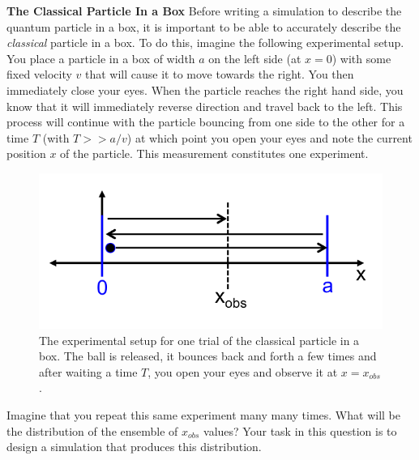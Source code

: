 \documentclass[12pt]{article}
\begin{document}
\newline
\newline
\textbf{The Classical Particle In a Box} 
\newline
\newline
Before writing a simulation to describe the quantum particle in a box, it is important to be able to accurately describe the \textit{classical} particle in a box.  To do this, imagine the following experimental setup.  You place a particle in a box of width $a$ on the left side (at $x=$0) with some fixed velocity $v$ that will cause it to move towards the right.  You then immediately close your eyes.  When the particle reaches the right hand side, you know that it will immediately reverse direction and travel back to the left.  This process will continue with the particle bouncing from one side to the other for a time $T$ (with $T>>a/v$) at which point you open your eyes and note the current position $x$ of the particle.  This measurement constitutes one experiment.
\begin{figure}[h!]
  \center
  \includegraphics[width=0.5\linewidth]{classical.png}
  \caption{The experimental setup for one trial of the classical particle in a box.  The ball is released, it bounces back and forth a few times and after waiting a time $T$, you open your eyes and observe it at $x=x_{obs}$.}
  \label{fig:riemann}
\end{figure}
Imagine that you repeat this same experiment many many times. What will be the distribution of the ensemble of $x_{obs}$ values?  Your task in this question is to design a simulation that produces this distribution.
\newline
\newline
\end{document}

